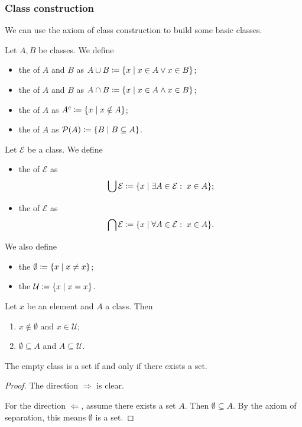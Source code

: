 \subsubsection{Class construction}
We can use the axiom of class construction to build some basic classes.

\begin{definition}
Let $A,B$ be classes. We define
\begin{itemize}
\item the  of $A$ and $B$ as $A \cup B \defeq \setbuilder{x}{x\in A \lor x\in B}$;
\item the  of $A$ and $B$ as $A \cap B \defeq \setbuilder{x}{x\in A \land x\in B}$;
\item the  of $A$ as $A^c \defeq \setbuilder{x}{x\notin A}$;
\item the  of $A$ as $\powerset(A) \defeq \setbuilder{B}{B \subseteq A}$.
\end{itemize}
Let $\mathcal{E}$ be a class. We define
\begin{itemize}
\item the  of $\mathcal{E}$ as
\[ \bigcup \mathcal{E} \defeq \setbuilder{x}{\exists A\in \mathcal{E}: \; x\in A}; \]
\item the  of $\mathcal{E}$ as
\[ \bigcap \mathcal{E} \defeq \setbuilder{x}{\forall A\in \mathcal{E}: \; x\in A}. \]
\end{itemize}
We also define
\begin{itemize}
\item the  $\emptyset \defeq \setbuilder{x}{x \neq x}$;
\item the  $\mathcal{U} \defeq \setbuilder{x}{x = x}$.
\end{itemize}
\end{definition}

\begin{lemma}
Let $x$ be an element and $A$ a class. Then
\begin{enumerate}
\item $x\notin \emptyset$ and $x\in \mathcal{U}$;
\item $\emptyset \subseteq A$ and $A \subseteq \mathcal{U}$.
\end{enumerate}
\end{lemma}

\begin{lemma}
The empty class is a set \textup{if and only if} there exists a set.
\end{lemma}
\begin{proof}
The direction $\Rightarrow$ is clear.

For the direction $\Leftarrow$, assume there exists a set $A$. Then $\emptyset \subseteq A$. By the axiom of separation, this means $\emptyset$ is a set.
\end{proof}

